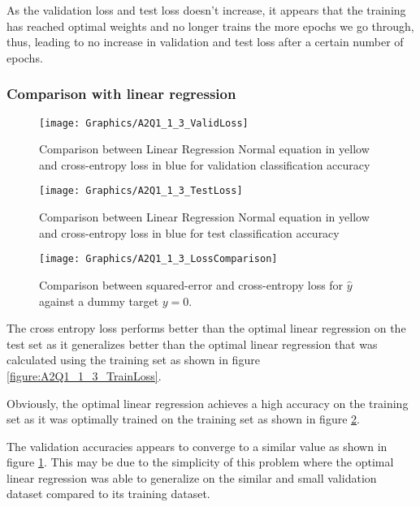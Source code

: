 \documentclass[a4paper,12pt]{article}
\begin{document}
As the validation loss and test loss doesn't increase, it appears that the training has reached optimal weights and no longer trains the more epochs we go through, thus, leading to no increase in validation and test loss after a certain number of epochs.

\clearpage
\subsubsection{Comparison with linear regression}

\begin{figure}[!htb]
\centering
\texttt{[image: Graphics/A2Q1\_1\_3\_ValidLoss]}
\caption{\label{figure:A2Q1_1_3_ValidLoss} Comparison between Linear Regression Normal equation in yellow and cross-entropy loss in blue for validation classification accuracy}
\end{figure}

\begin{figure}[!htb]
\centering
\texttt{[image: Graphics/A2Q1\_1\_3\_TestLoss]}
\caption{\label{figure:A2Q1_1_3_TestLoss} Comparison between Linear Regression Normal equation in yellow and cross-entropy loss in blue for test classification accuracy}
\end{figure}

\begin{figure}[!htb]
\centering
\texttt{[image: Graphics/A2Q1\_1\_3\_LossComparison]}
\caption{\label{figure:ComparingDifferentLosses} Comparison between squared-error and cross-entropy loss for $\hat{y}$ against a dummy target $y = 0$.}
\end{figure}

The cross entropy loss performs better than the optimal linear regression 
on the test set as it generalizes better than the optimal linear regression that was calculated using the training set as shown in figure \ref{figure:A2Q1_1_3_TrainLoss}. 

Obviously, the optimal linear regression achieves a high accuracy on the training set as it was optimally trained on the training set as shown in figure \ref{figure:A2Q1_1_3_TestLoss}. 

The validation accuracies appears to converge to a similar value as shown in figure \ref{figure:A2Q1_1_3_ValidLoss}. This may be due to the simplicity of this problem where the optimal linear regression was able to generalize on the similar and small validation dataset compared to its training dataset. 
\end{document}
